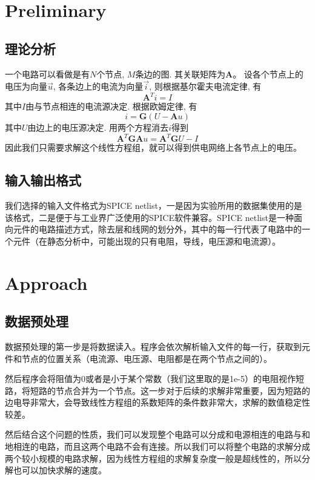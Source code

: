 \documentclass[UTF8,11pt]{report}
\begin{document}
\section{Preliminary}
\subsection{理论分析}
\label{subsec:theory}
一个电路可以看做是有$N$个节点, $M$条边的图. 其关联矩阵为$\mathbf{A}$。
设各个节点上的电压为向量$\vec{u}$, 各条边上的电流为向量$\vec{i}$, 则根据基尔霍夫电流定律, 有
\begin{equation}
	\mathbf{A}^Ti=I
\end{equation}
其中$I$由与节点相连的电流源决定. 根据欧姆定律, 有
\begin{equation}
	i=\mathbf{G}(U-\mathbf{A}u)
\end{equation}
其中$U$由边上的电压源决定. 用两个方程消去$i$得到
\begin{equation}
	\mathbf{A}^T\mathbf{G}\mathbf{A}u=\mathbf{A}^T\mathbf{G}U-I
\end{equation}
因此我们只需要求解这个线性方程组，就可以得到供电网络上各节点上的电压。
\subsection{输入输出格式}
我们选择的输入文件格式为SPICE netlist，一是因为实验所用的数据集使用的是该格式，二是便于与工业界广泛使用的SPICE软件兼容。SPICE netlist是一种面向元件的电路描述方式，除去层和线网的划分外，其中的每一行代表了电路中的一个元件（在静态分析中，可能出现的只有电阻，导线，电压源和电流源）。
\section{Approach}
\subsection{数据预处理}
数据预处理的第一步是将数据读入。程序会依次解析输入文件的每一行，获取到元件和节点的位置关系（电流源、电压源、电阻都是在两个节点之间的）。

然后程序会将阻值为0或者是小于某个常数（我们这里取的是1e-5）的电阻视作短路，将短路的节点合并为一个节点。这一步对于后续的求解非常重要，因为短路的边电导非常大，会导致线性方程组的系数矩阵的条件数非常大，求解的数值稳定性较差。

然后结合这个问题的性质，我们可以发现整个电路可以分成和电源相连的电路与和地相连的电路，而且这两个电路不会有连接。所以我们可以将整个电路的求解分成两个较小规模的电路求解，因为线性方程组的求解复杂度一般是超线性的，所以分解也可以加快求解的速度。
\end{document}
